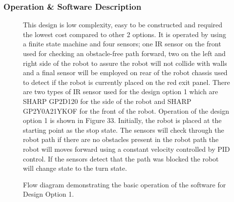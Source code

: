 \documentclass[a4paper]{article}
\begin{document}
\subsubsection{Operation \& Software Description}
\begin{figure}[h]
\begin{minipage}{0.45\textwidth}
This design is low complexity, easy to be constructed and required the lowest cost compared to other 2 options. It is operated by using a finite state machine and four sensors;  one IR sensor on the front used for checking an obstacle-free path forward, two on the left and right side of the robot to assure the robot will not collide with walls and a final sensor will be employed on rear of the robot chassis used to detect if the robot is currently placed on the red exit panel. There are two types of IR sensor used for the design option 1 which are SHARP GP2D120 for the side of the robot and SHARP GP2Y0A21YKOF for the front of the robot. Operation of the design option 1 is shown in Figure 33. Initially, the robot is placed at the starting point as the stop state. The sensors will check through the robot path if there are no obstacles present in the robot path the robot will moves forward using a constant velocity controlled by PID control. If the sensors detect that the path was blocked the robot will change state to the turn state. 
\end{minipage}
\hspace{1cm}
\begin{minipage}{0.45\textwidth}
\centering
{}
\caption{Flow diagram demonstrating the basic operation of the software for Design Option 1.}
\end{minipage}
\end{figure}
\end{document}
